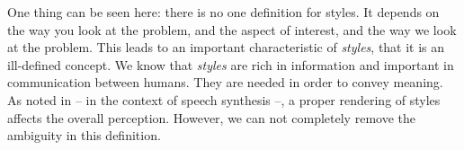  \par One thing can be seen here: there is no one definition for styles. It depends on the way you look at the problem, and the aspect of interest, and the way we look at the problem. This leads to an important characteristic of \textit{styles}, that it is an ill-defined concept. We know that \textit{styles} are rich in information and important in communication between humans. They are needed in order to convey meaning. As noted in \citep{taylor2009text} -- in the context of speech synthesis --, a proper rendering of styles affects the overall perception. However, we can not completely remove the ambiguity in this definition.






